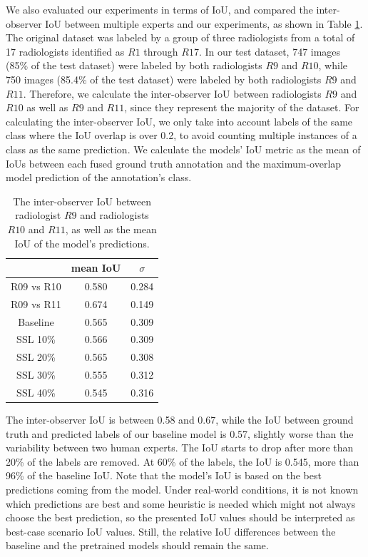 \documentclass[conference]{IEEEtran}
\begin{document}
We also evaluated our experiments in terms of IoU, and compared the inter-observer IoU between multiple experts and our experiments, as shown in Table 
\ref{tab:iou}. The original dataset was labeled by a group of three radiologists from a total of 17 radiologists identified as $R1$ through $R17$. In our test 
dataset, 747 images (85\% of the test dataset) were labeled by both radiologists $R9$ and $R10$, while 750 images (85.4\% of the test dataset) were labeled by 
both radiologists $R9$ and $R11$. Therefore, we calculate the inter-observer IoU between radiologists $R9$ and $R10$ as well as $R9$ and $R11$, since they 
represent the majority of the dataset. For calculating the inter-observer IoU, we only take into account labels of the same class where the IoU overlap is over 0.2, to avoid 
counting multiple instances of a class as the same prediction. We calculate the models' IoU metric as the mean of IoUs between each fused ground truth 
annotation and the maximum-overlap model prediction of the annotation's class.

\begin{table}[b]
\renewcommand{\arraystretch}{1.3}
\caption{The inter-observer IoU between radiologist $R9$ and radiologists $R10$ and $R11$, as well as the mean IoU of the model's predictions.}
\label{tab:iou}
\centering
\begin{tabular}{|c|c|c|}
\hline
& mean IoU & $\sigma$ \\ \hline
R09 vs R10 & 0.580 & 0.284 \\ \hline
R09 vs R11 & 0.674 & 0.149 \\ \hline
Baseline & 0.565 & 0.309 \\ \hline
SSL 10\% & 0.566 & 0.309 \\ \hline
SSL 20\% & 0.565 & 0.308 \\ \hline
SSL 30\% & 0.555 & 0.312 \\ \hline
SSL 40\% & 0.545 & 0.316 \\ \hline
\end{tabular}
\end{table}

The inter-observer IoU is between 0.58 and 0.67, while the IoU between ground truth and predicted 
labels of our baseline model is 0.57, slightly worse than the variability between two human 
experts. The IoU starts to drop after more than 20\% of the labels are removed. At 60\% of the 
labels, the IoU is 0.545, more than 96\% of the baseline IoU. Note that the model's IoU is based on 
the best predictions coming from the model. Under real-world conditions, it is not known which 
predictions are best and some heuristic is needed which might not always choose the best 
prediction, so the presented IoU values should be interpreted as best-case scenario IoU values. 
Still, the relative IoU differences between the baseline and the pretrained models should remain the same.
\end{document}
